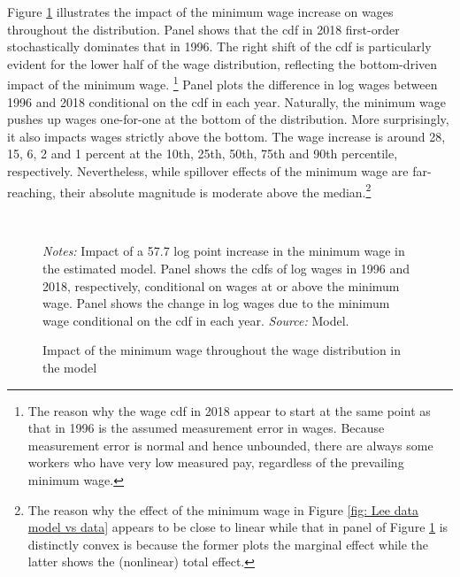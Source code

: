 Figure \ref{figure: cdfs} illustrates the impact of the minimum wage increase on wages throughout the distribution. Panel  shows that the cdf in 2018 first-order stochastically dominates that in 1996. The right shift of the cdf is particularly evident for the lower half of the wage distribution, reflecting the bottom-driven impact of the minimum wage.%
%
\footnote{The reason why the wage cdf in 2018 appear to start at the same point as that in 1996 is the assumed measurement error in wages. Because measurement error is normal and hence unbounded, there are always some workers who have very low measured pay, regardless of the prevailing minimum wage.} %
%
Panel  plots the difference in log wages between 1996 and 2018 conditional on the cdf in each year. Naturally, the minimum wage pushes up wages one-for-one at the bottom of the distribution. More surprisingly, it also impacts wages strictly above the bottom. The wage increase is around 28, 15, 6, 2 and 1 percent at the 10th, 25th, 50th, 75th and 90th percentile, respectively. Nevertheless, while spillover effects of the minimum wage are far-reaching, their absolute magnitude is moderate above the median.\footnote{The reason why the effect of the minimum wage in Figure \ref{fig: Lee data model vs data} appears to be close to linear while that in panel  of Figure \ref{figure: cdfs} is distinctly convex is because the former plots the marginal effect while the latter shows the (nonlinear) total effect.}


\begin{figure}[!htb]

  \centering
  \caption{Impact of the minimum wage throughout the wage distribution in the model\label{figure: cdfs}}
  \prefigvspace
  \\
  \postfigvspace
  \begin{minipage}[t]{1\columnwidth}%
    \begin{spacing}{0.75}
      \emph{\scriptsize{}Notes: }{\scriptsize{}Impact of a 57.7 log point increase in the minimum wage in the estimated model. Panel  shows the cdfs of log wages in 1996 and 2018, respectively, conditional on wages at or above the minimum wage. Panel  shows the change in log wages due to the minimum wage conditional on the cdf in each year. %
      \emph{\scriptsize{}Source: } Model.}
    \end{spacing}
  \end{minipage}
\end{figure}


